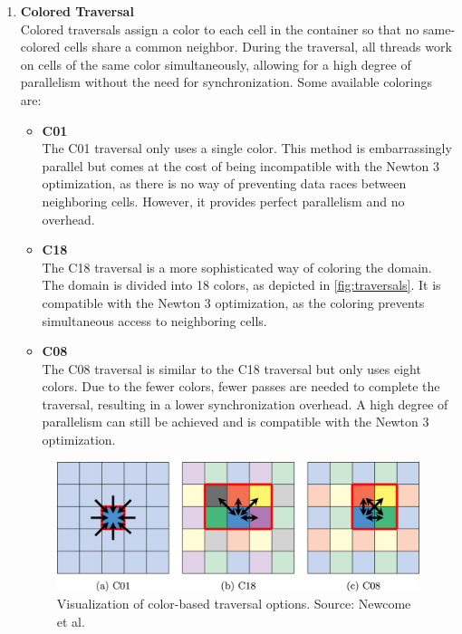 \begin{enumerate}[label=\textbf{\arabic*.}]
\begin{enumerate}
                  \item \textbf{Colored Traversal} \\
                        Colored traversals assign a color to each cell in the container so that no same-colored cells share a common neighbor.
                        During the traversal, all threads work on cells of the same color simultaneously, allowing for a high degree of parallelism without the need for synchronization. Some available colorings are:
                        \begin{itemize}
                              \item \textbf{C01} \\
                                    The C01 traversal only uses a single color. This method is embarrassingly parallel but comes at the cost of being incompatible with the Newton 3 optimization, as there is no way of preventing data races between neighboring cells. However, it provides perfect parallelism and no overhead.

                              \item \textbf{C18} \\
                                    The C18 traversal is a more sophisticated way of coloring the domain. The domain is divided into 18 colors, as depicted in \autoref{fig:traversals}. It is compatible with the Newton 3 optimization, as the coloring prevents simultaneous access to neighboring cells.

                              \item \textbf{C08} \\
                                    The C08 traversal is similar to the C18 traversal but only uses eight colors. Due to the fewer colors, fewer passes are needed to complete the traversal, resulting in a lower synchronization overhead. A high degree of parallelism can still be achieved and is compatible with the Newton 3 optimization.\\
                        \end{itemize}

                        \begin{figure}[H]
                              \centering
                              \includegraphics[width=0.7\columnwidth]{figures/Intro/traversals.jpg}
                              \caption[Visualization of different color-based traversal options in AutoPas.]                             {Visualization of color-based traversal options. \small{Source: Newcome et al.~\cite{Newcome2023}}}
                              \label{fig:traversals}
                        \end{figure}


\end{enumerate}
\end{enumerate}
